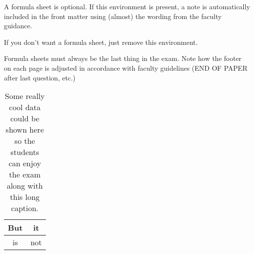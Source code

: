 \documentclass[]{uosexam}
\begin{document}
\begin{formulasheet}
A formula sheet is optional. If this environment is present, a note is automatically included in the front matter
using (almost) the wording from the faculty guidance.

If you don't want a formula sheet, just remove this environment.

Formula sheets must always be the last thing in the exam. Note how the footer on each page is adjusted
in accordance with faculty guidelines (END OF PAPER after last question, etc.)

\begin{table}[htb]
\caption{Some really cool data could be shown here so the students can enjoy the exam along with this long caption.}
\begin{center}
\begin{tabular}{|c|c|}
\hline
But & it \\
\hline
is & not \\
\hline
\end{tabular}
\end{center}
\label{tab:mytable}
\end{table}

\end{formulasheet}
\end{document}
